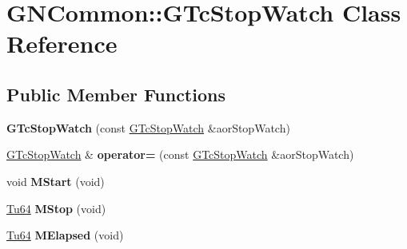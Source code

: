 \hypertarget{class_g_n_common_1_1_g_tc_stop_watch}{}\section{G\+N\+Common\+:\+:G\+Tc\+Stop\+Watch Class Reference}
\label{class_g_n_common_1_1_g_tc_stop_watch}
\subsection*{Public Member Functions}
\begin{DoxyCompactItemize}
\item 
\mbox{\label{class_g_n_common_1_1_g_tc_stop_watch_ae442c6e313df8f2ad22b4ceef71b89ab}} 
{\bfseries G\+Tc\+Stop\+Watch} (const \mbox{\hyperlink{class_g_n_common_1_1_g_tc_stop_watch}{G\+Tc\+Stop\+Watch}} \&aor\+Stop\+Watch)
\item 
\mbox{\label{class_g_n_common_1_1_g_tc_stop_watch_a334776e4f98289f2093b2da4cf3cb8b8}} 
\mbox{\hyperlink{class_g_n_common_1_1_g_tc_stop_watch}{G\+Tc\+Stop\+Watch}} \& {\bfseries operator=} (const \mbox{\hyperlink{class_g_n_common_1_1_g_tc_stop_watch}{G\+Tc\+Stop\+Watch}} \&aor\+Stop\+Watch)
\item 
\mbox{\label{class_g_n_common_1_1_g_tc_stop_watch_ad62dfcb669827907489089ff31be6325}} 
void {\bfseries M\+Start} (void)
\item 
\mbox{\label{class_g_n_common_1_1_g_tc_stop_watch_a3b7ec35c07140a12d3a7d539dbb7b80d}} 
\mbox{\hyperlink{namespace_g_n_common_a9404ee6090c788ae70aebd1436ceb97d}{Tu64}} {\bfseries M\+Stop} (void)
\item 
\mbox{\label{class_g_n_common_1_1_g_tc_stop_watch_a0569d663b5d612924bf287f8382359b2}} 
\mbox{\hyperlink{namespace_g_n_common_a9404ee6090c788ae70aebd1436ceb97d}{Tu64}} {\bfseries M\+Elapsed} (void)
\end{DoxyCompactItemize}
